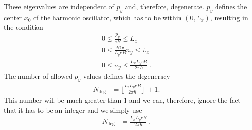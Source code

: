 %
These eigenvalues are independent of $p_{y}$ and, therefore, degenerate. $p_{y}$ defines the 
center $x_{0}$ of the harmonic oscillator, which has to be within $(0,L_{x})$, resulting in the condition
%
\begin{align*}
0\le \frac{p_{y}}{e B} \le L_{x} \\
0\le \frac{\hbar 2\pi }{L_{y} e B}n_{y} \le L_{x} \\
0\le n_{y} \le \frac{L_{x} L_{y} e B}{ 2\pi\hbar}\;.
\end{align*}
%
The number of allowed $p_{y}$ values defines the degeneracy
%
\begin{align*}
N_\text{deg} &= \bigg\lfloor\frac{L_{x} L_{y} e B}{ 2\pi\hbar }\bigg\rfloor\; +1.
\end{align*}
%
This number will be much greater than 1 and we can, therefore, ignore the fact that it has to be an integer and we simply use
\begin{align}
N_\text{deg} &= \frac{L_{x} L_{y} e B}{ 2\pi\hbar }\;.
\end{align}



